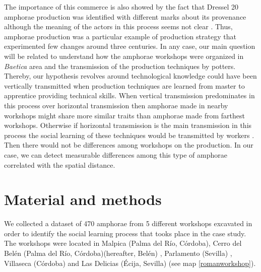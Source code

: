 \documentclass[review]{elsarticle}
\begin{document}
The importance of this commerce is also showed by the fact that Dressel 20 amphorae production was identified with different marks about its provenance although the meaning of the actors in this process seems not clear \citep{coto-sarmiento_maria_bayesian_????}. Thus, amphorae production was a particular example of production strategy that experimented few changes around three centuries. In any case, our main question will be related to understand how the amphorae workshops were organized in \textit{Baetica} area and the transmission of the production techniques by potters. Thereby, our hypothesis revolves around technological knowledge could have been vertically transmitted when production techniques are learned from master to apprentice providing technical skills. When vertical transmission predominates in this process over horizontal transmission then amphorae made in nearby workshops might share more similar traits than amphorae made from farthest workshops. Otherwise if horizontal transmission is the main transmission in this process the social learning of these techniques would be transmitted by workers \citep{hosfield_modes_2009}. Then there would not be differences among workshops on the production. In our case, we can detect measurable differences among this type of amphorae correlated with the spatial distance.


\section{Material and methods}

We collected a dataset of 470 amphorae from 5 different workshops excavated in order to identify the social learning process that tooks place in the case study. The workshops were located in Malpica (Palma del R\'io, C\'ordoba), Cerro del Bel\'en (Palma del R\'io, C\'ordoba)(hereafter, Bel\'en) \citep{diaz_trujillo_excavacion_1992}, Parlamento (Sevilla) \citep{garcia_vargas_anforas_2000}, Villaseca (C\'ordoba)\citep{garcia_vargas_enrique_excavacion_????} and Las Delicias (\'Ecija, Sevilla) \citep{fernandez_excavacion_2001,_atelier_2014} (see map \ref{romanworkshop}).
\end{document}
